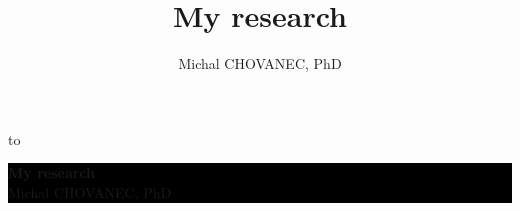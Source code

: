 \documentclass[xcolor=dvipsnames]{beamer}
\title{\color{white} \bf My research}
\author{\color{white} Michal CHOVANEC, PhD}
\date[EURP]{}
\begin{document}
{
    \usebackgroundtemplate
    {
        \vbox to 
    }
    \begin{frame}



    \centering
     \colorbox{black}
     {
        \begin{minipage}{7cm}
           {\LARGE \color{white} \bf My research} \\
           {\LARGE \color{white} Michal CHOVANEC, PhD} \\
       \end{minipage}
     }


    \end{frame}
}
\end{document}
